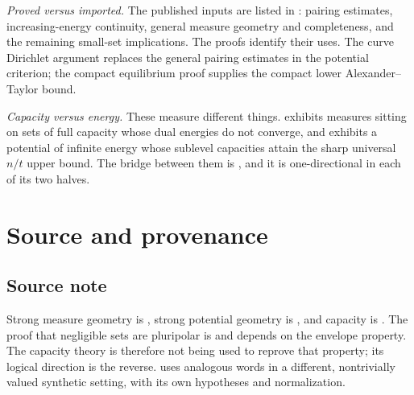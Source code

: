 \emph{Proved versus imported.}  The published inputs are listed in :
pairing estimates, increasing-energy continuity, general measure
geometry and completeness, and the remaining small-set implications.
The proofs identify their uses. The curve Dirichlet argument replaces
the general pairing estimates in the potential criterion; the compact
equilibrium proof supplies the compact lower Alexander--Taylor bound.

\emph{Capacity versus energy.}  These measure different things.
 exhibits measures sitting on sets of full
capacity whose dual energies do not converge, and
 exhibits a potential of infinite energy whose
sublevel capacities attain the sharp universal $n/t$ upper bound.  The bridge
between them is , and it is one-directional
in each of its two halves.

\section{Source and provenance}
\label{sec:ch48-source}

\subsection{Source note}
\label{sec:ch48-source-note}

Strong measure geometry is \cite[\S10]{BJ22}, strong potential geometry is
\cite[\S12]{BJ22}, and capacity is \cite[\S\S7.7 and~13]{BJ22}.  The proof
that negligible sets are pluripolar is \cite[Theorem~13.17]{BJ22} and
depends on the envelope property.
The capacity theory is therefore not being used to reprove that property;
its logical direction is the reverse.  
uses analogous words in a
different, nontrivially valued synthetic setting, with its own hypotheses
and normalization.

